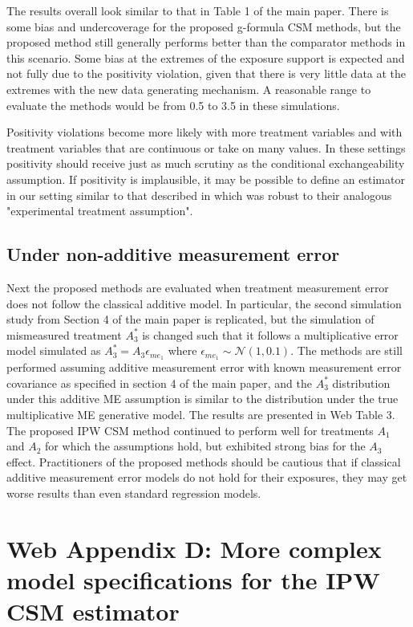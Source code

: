 \documentclass[12pt]{article}
\begin{document}
The results overall look similar to that in Table 1 of the main paper. There is some bias and undercoverage for the proposed g-formula CSM methods, but the proposed method still generally performs better than the comparator methods in this scenario. Some bias at the extremes of the exposure support is expected and not fully due to the positivity violation, given that there is very little data at the extremes with the new data generating mechanism. A reasonable range to evaluate the methods would be from 0.5 to 3.5 in these simulations.

Positivity violations become more likely with more treatment variables and with treatment variables that are continuous or take on many values. In these settings positivity should receive just as much scrutiny as the conditional exchangeability assumption. If positivity is implausible, it may be possible to define an estimator in our setting similar to that described in \citet{neugebauer2005} which was robust to their analogous "experimental treatment assumption".

\subsection{Under non-additive measurement error}

Next the proposed methods are evaluated when treatment measurement error does not follow the classical additive model. In particular, the second simulation study from Section 4 of the main paper is replicated, but the simulation of mismeasured treatment $A^{*}_{3}$ is changed such that it follows a multiplicative error model simulated as $A_{3}^{*} = A_{3} \epsilon_{me_{1}}$ where $\epsilon_{me_{1}} \sim \mathcal{N}(1, 0.1)$. The methods are still performed assuming additive measurement error with known measurement error covariance as specified in section 4 of the main paper, and the $A^{*}_{3}$ distribution under this additive ME assumption is similar to the distribution under the true multiplicative ME generative model. The results are presented in Web Table 3. The proposed IPW CSM method continued to perform well for treatments $A_{1}$ and $A_{2}$ for which the assumptions hold, but exhibited strong bias for the $A_{3}$ effect. Practitioners of the proposed methods should be cautious that if classical additive measurement error models do not hold for their exposures, they may get worse results than even standard regression models.

\section{Web Appendix D: More complex model specifications for the IPW CSM estimator}
\end{document}
